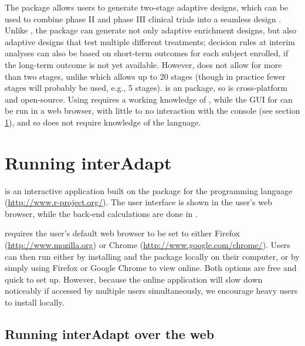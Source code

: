 \documentclass[article]{jss}
\begin{document}
The  package allows  users to generate  two-stage adaptive designs, which can be used to combine phase II and phase III clinical trials into a seamless design \citep{parsons2012r}. Unlike , the  package can generate  not only adaptive enrichment designs, but also adaptive designs that test multiple different treatments; decision rules at interim analyses can also be based on short-term outcomes for each subject enrolled, if the long-term outcome is not yet available. However,  does not allow for more than two stages, unlike   which allows up to 20 stages (though in practice fewer stages will probably be used, e.g., 5 stages).  is an   package, so is cross-platform and open-source. Using 
 requires a working knowledge of , while the GUI for  can be run in a web browser, with little to no interaction with the  console (see section \ref{sec:running-interAdapt}), and so does not require knowledge of the  language.

\section{Running interAdapt }%
\label{sec:running-interAdapt}

 is an interactive application built on the  package \citep{shiny2013manual} for the  programming language (\url{http://www.r-project.org/}). The user interface is shown in the user’s web browser, while the back-end calculations are done in . 

 requires the user's default web browser to be set to either Firefox (\url{http://www.mozilla.org}) or Chrome (\url{http://www.google.com/chrome/}). Users can then run  either by installing  and the   package locally on their computer, or by simply using Firefox or Google Chrome to view  online. Both options are free and quick to set up. However, because the online application will slow down noticeably if accessed by multiple users simultaneously, we encourage heavy users to install  locally.


\subsection{Running interAdapt over the web}
\label{sub:running-online}
\end{document}
